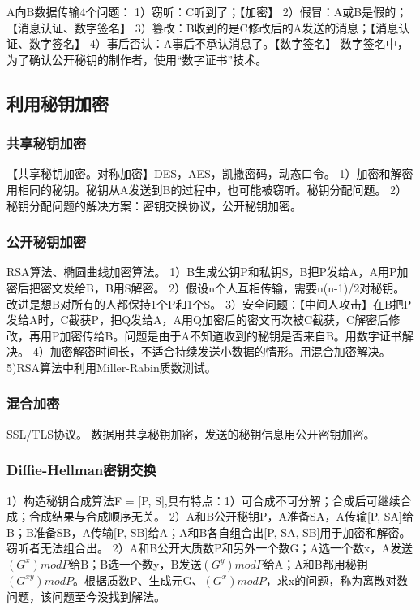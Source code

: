 \documentclass[UTF8]{../computerUniverse}
\begin{document}
A向B数据传输4个问题：
1）窃听：C听到了；【加密】
2）假冒：A或B是假的；【消息认证、数字签名】
3）篡改：B收到的是C修改后的A发送的消息；【消息认证、数字签名】
4）事后否认：A事后不承认消息了。【数字签名】
数字签名中，为了确认公开秘钥的制作者，使用“数字证书”技术。



\subsection{利用秘钥加密}

\subsubsection{共享秘钥加密}
【共享秘钥加密。对称加密】DES，AES，凯撒密码，动态口令。
1）加密和解密用相同的秘钥。秘钥从A发送到B的过程中，也可能被窃听。秘钥分配问题。
2）秘钥分配问题的解决方案：密钥交换协议，公开秘钥加密。


\subsubsection{公开秘钥加密}
RSA算法、椭圆曲线加密算法。
1）B生成公钥P和私钥S，B把P发给A，A用P加密后把密文发给B，B用S解密。
2）假设n个人互相传输，需要n(n-1)/2对秘钥。改进是想B对所有的人都保持1个P和1个S。
3）安全问题：【中间人攻击】在B把P发给A时，C截获P，把Q发给A，A用Q加密后的密文再次被C截获，C解密后修改，再用P加密传给B。问题是由于A不知道收到的秘钥是否来自B。用数字证书解决。
4）加密解密时间长，不适合持续发送小数据的情形。用混合加密解决。
5)RSA算法中利用Miller-Rabin质数测试。


\subsubsection{混合加密}
SSL/TLS协议。
数据用共享秘钥加密，发送的秘钥信息用公开密钥加密。


\subsubsection{Diffie-Hellman密钥交换}
1）构造秘钥合成算法F = [P, S],具有特点：1）可合成不可分解；合成后可继续合成；合成结果与合成顺序无关。
2）A和B公开秘钥P，A准备SA，A传输[P, SA]给B；B准备SB，A传输[P, SB]给A；A和B各自组合出[P, SA, SB]用于加密和解密。窃听者无法组合出。
2）A和B公开大质数P和另外一个数G；A选一个数x，A发送$(G^x)modP$给B；B选一个数y，B发送$(G^y)modP$给A；A和B都用秘钥$(G^{xy})modP$。根据质数P、生成元G、$(G^x)modP$，求x的问题，称为离散对数问题，该问题至今没找到解法。
\end{document}

